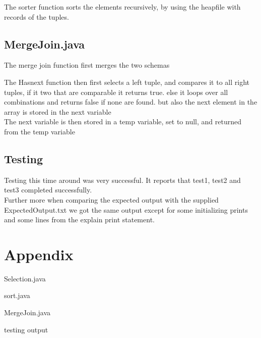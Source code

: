 \documentclass[a4paper,10pt,titlepage]{report}
\begin{document}
The sorter function sorts the elements recursively, by using the heapfile with records of the tuples.
	
\subsection{MergeJoin.java}
The merge join function first merges the two schemas


The Hasnext function then first selects a left tuple, and compares it to all right tuples, if it two that are comparable it returns true. else it loops over all combinations and returns false if none are found. but also the next element in the array is stored in the next variable\\

The next variable is then stored in a temp variable, set to null, and returned from the temp variable


\subsection{Testing}
Testing this time around was very successful. It reports that test1, test2 and test3 completed successfully. \\
Further more when comparing the expected output with the supplied ExpectedOutput.txt we got the same output except for some initializing  prints and some lines from the explain print statement. \\

\section{Appendix}
Selection.java


sort.java


MergeJoin.java


testing output

\end{document}
